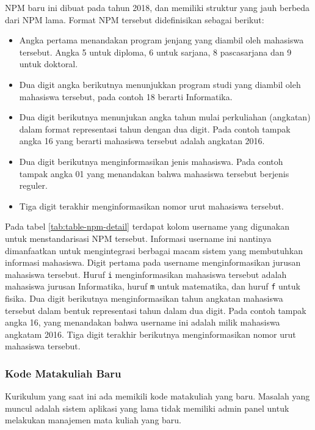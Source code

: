     NPM baru ini dibuat pada tahun 2018, dan memiliki struktur yang jauh berbeda
    dari NPM lama. Format NPM tersebut didefinisikan sebagai berikut:
    
    \begin{itemize}
        \item Angka pertama menandakan program jenjang yang diambil oleh mahasiswa
        tersebut. Angka 5 untuk diploma, 6 untuk sarjana, 8 pascasarjana dan 9 untuk
        doktoral. 
    
        \item Dua digit angka berikutnya menunjukkan program studi yang diambil oleh
        mahasiswa tersebut, pada contoh 18 berarti Informatika. 
        
        \item Dua digit berikutnya menunjukan angka tahun mulai perkuliahan
        (angkatan) dalam format representasi tahun dengan dua digit. Pada contoh
        tampak angka 16 yang berarti mahasiswa tersebut adalah angkatan 2016. 
        
        \item Dua digit berikutnya menginformasikan jenis mahasiswa. Pada contoh
        tampak angka 01 yang menandakan bahwa mahasiswa tersebut berjenis reguler.
        
        \item Tiga digit terakhir menginformasikan nomor urut mahasiswa tersebut.
    \end{itemize}
    
    Pada tabel \ref{tab:table-npm-detail} terdapat kolom username yang digunakan
    untuk menstandarisasi NPM tersebut. Informasi username ini nantinya
    dimanfaatkan untuk mengintegrasi berbagai macam sistem yang membutuhkan
    informasi mahasiswa. Digit pertama pada username menginformasikan jurusan
    mahasiswa tersebut. Huruf \texttt{i} menginformasikan mahasiswa tersebut
    adalah mahasiswa jurusan Informatika, huruf \texttt{m} untuk matematika, dan
    huruf \texttt{f} untuk fisika. Dua digit berikutnya menginformasikan tahun
    angkatan mahasiswa tersebut dalam bentuk representasi tahun dalam dua digit.
    Pada contoh tampak angka 16, yang menandakan bahwa username ini adalah milik
    mahasiswa angkatam 2016. Tiga digit terakhir berikutnya menginformasikan
    nomor urut mahasiswa tersebut.
    
    \subsubsection{Kode Matakuliah Baru}\label{ref-prob-admin-kode-mk-baru}
    Kurikulum yang saat ini ada memikili kode matakuliah yang baru. Masalah yang
    muncul adalah sistem aplikasi yang lama tidak memiliki admin panel untuk
    melakukan manajemen mata kuliah yang baru.
    
